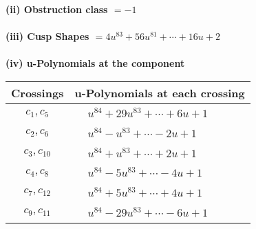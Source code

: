 \documentclass[1p]{elsarticle_modified}
\theoremstyle{definition}
\begin{document}
\flushleft \textbf{(ii) Obstruction class $= -1$}\\~\\
\flushleft \textbf{(iii) Cusp Shapes $= 4 u^{83}+56 u^{81}+\cdots+16 u+2$}\\~\\
\newpage\renewcommand{\arraystretch}{1}
\flushleft \textbf{(iv) u-Polynomials at the component}\newline \\
\begin{tabular}{m{50pt}|m{274pt}}
Crossings & \hspace{64pt}u-Polynomials at each crossing \\
\hline $$\begin{aligned}c_{1},c_{5}\end{aligned}$$&$\begin{aligned}
&u^{84}+29 u^{83}+\cdots+6 u+1
\end{aligned}$\\
\hline $$\begin{aligned}c_{2},c_{6}\end{aligned}$$&$\begin{aligned}
&u^{84}- u^{83}+\cdots-2 u+1
\end{aligned}$\\
\hline $$\begin{aligned}c_{3},c_{10}\end{aligned}$$&$\begin{aligned}
&u^{84}+u^{83}+\cdots+2 u+1
\end{aligned}$\\
\hline $$\begin{aligned}c_{4},c_{8}\end{aligned}$$&$\begin{aligned}
&u^{84}-5 u^{83}+\cdots-4 u+1
\end{aligned}$\\
\hline $$\begin{aligned}c_{7},c_{12}\end{aligned}$$&$\begin{aligned}
&u^{84}+5 u^{83}+\cdots+4 u+1
\end{aligned}$\\
\hline $$\begin{aligned}c_{9},c_{11}\end{aligned}$$&$\begin{aligned}
&u^{84}-29 u^{83}+\cdots-6 u+1
\end{aligned}$\\
\hline
\end{tabular}\\~\\
\end{document}
